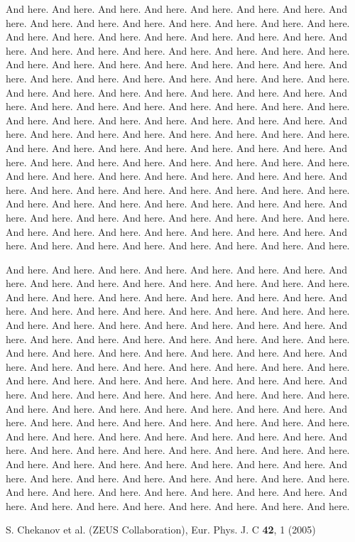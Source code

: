 \documentclass[pdftex,epjc3]{svjour3}          %
\begin{document}
And here. And here. And here. And here. And here. And here. And here. And here. And here. And here. And here. And here. And here. And here. And here. 
And here. And here. And here. And here. And here. And here. And here. And here. And here. And here. And here. And here. And here. And here. And here. 
And here. And here. And here. And here. And here. And here. And here. And here. And here. And here. And here. And here. And here. And here. And here. 
And here. And here. And here. And here. And here. And here. And here. And here. And here. And here. And here. And here. And here. And here. And here. 
And here. And here. And here. And here. And here. And here. And here. And here. And here. And here. And here. And here. And here. And here. And here. 
And here. And here. And here. And here. And here. And here. And here. And here. And here. And here. And here. And here. And here. And here. And here. 
And here. And here. And here. And here. And here. And here. And here. And here. And here. And here. And here. And here. And here. And here. And here. 
And here. And here. And here. And here. And here. And here. And here. And here. And here. And here. And here. And here. And here. And here. And here. 
And here. And here. And here. And here. And here. And here. And here. And here. And here. And here. And here. And here. And here. And here. And here. 

And here. And here. And here. And here. And here. And here. And here. And here. And here. And here. And here. And here. And here. And here. And here. 
And here. And here. And here. And here. And here. And here. And here. And here. And here. And here. And here. And here. And here. And here. And here. 
And here. And here. And here. And here. And here. And here. And here. And here. And here. And here. And here. And here. And here. And here. And here. 
And here. And here. And here. And here. And here. And here. And here. And here. And here. And here. And here. And here. And here. And here. And here. 
And here. And here. And here. And here. And here. And here. And here. And here. And here. And here. And here. And here. And here. And here. And here. 
And here. And here. And here. And here. And here. And here. And here. And here. And here. And here. And here. And here. And here. And here. And here. 
And here. And here. And here. And here. And here. And here. And here. And here. And here. And here. And here. And here. And here. And here. And here. 
And here. And here. And here. And here. And here. And here. And here. And here. And here. And here. And here. And here. And here. And here. And here. 
And here. And here. And here. And here. And here. And here. And here. And here. And here. And here. And here. And here. And here. And here. And here. 



\begin{thebibliography}{9}
S. Chekanov et al. (ZEUS Collaboration), Eur. Phys. J. C \textbf{42}, 1 (2005)
\end{thebibliography}
\end{document}
